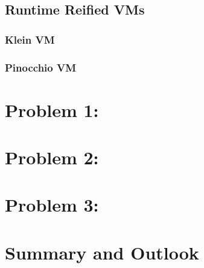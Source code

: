 \subsection{Runtime Reified VMs}
\subsubsection{Klein VM}
\subsubsection{Pinocchio VM}


\section{Problem 1: }


\section{Problem 2: }


\section{Problem 3: }


\section{Summary and Outlook}

